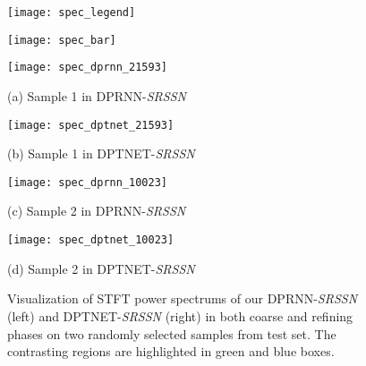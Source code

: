 \begin{figure*}[!t]
\centering
  \begin{minipage}[b]{0.42\linewidth}
    \centering
    \texttt{[image: spec\_legend]}
  \end{minipage}
  \hspace{0.05\linewidth}
  \begin{minipage}[b]{0.42\linewidth}
    \centering
    \texttt{[image: spec\_bar]}
  \end{minipage}
  \begin{minipage}[b]{0.42\linewidth}
    \centering
    \texttt{[image: spec\_dprnn\_21593]}
    \centerline{(a) Sample 1 in DPRNN-\emph{SRSSN}}\medskip
  \end{minipage}
  \hspace{0.05\linewidth}
  \begin{minipage}[b]{0.42\linewidth}
    \centering
    \texttt{[image: spec\_dptnet\_21593]}
    \centerline{(b) Sample 1 in DPTNET-\emph{SRSSN}}\medskip
  \end{minipage}
  \begin{minipage}[b]{0.42\linewidth}
    \centering
    \texttt{[image: spec\_dprnn\_10023]}
    \centerline{(c) Sample 2 in DPRNN-\emph{SRSSN}}\medskip
  \end{minipage}
  \hspace{0.05\linewidth}
  \begin{minipage}[b]{0.42\linewidth}
    \centering
    \texttt{[image: spec\_dptnet\_10023]}
    \centerline{(d) Sample 2 in DPTNET-\emph{SRSSN}}\medskip
  \end{minipage}
  \caption{Visualization of STFT power spectrums of our DPRNN-\emph{SRSSN} (left) and DPTNET-\emph{SRSSN} (right) in both coarse and refining phases on two randomly selected samples from test set. The contrasting regions are highlighted in green and blue boxes.}
  \label{fig:real_examples}
\end{figure*}


